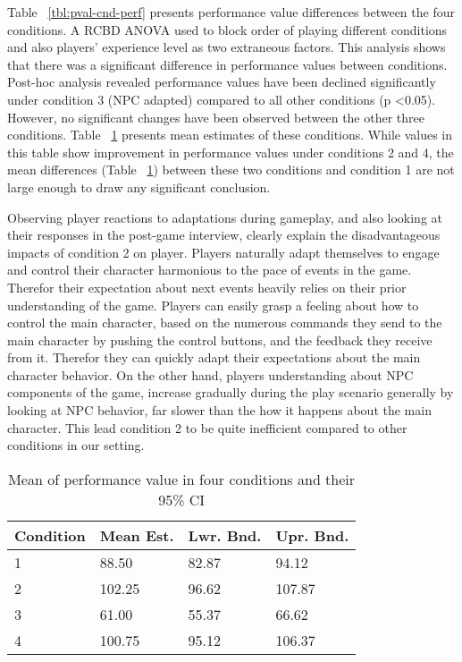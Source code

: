 \documentclass[conference]{IEEEtran}
\begin{document}
Table ~\ref{tbl:pval-cnd-perf} presents performance value differences between the four conditions. A RCBD ANOVA used to block order of playing different conditions and also players' experience level as two extraneous factors. This analysis shows that there was a significant difference in performance values between conditions. Post-hoc analysis revealed performance values have been declined significantly under condition 3 (NPC adapted) compared to all other conditions (p \textless 0.05). However, no significant changes have been observed between the other three conditions. Table ~\ref{tbl:mean-cnd-perf} presents mean estimates of these conditions. While values in this table show improvement in performance values under conditions 2 and 4, the mean differences (Table ~\ref{tbl:mean-cnd-perf}) between these two conditions and condition 1 are not large enough to draw any significant conclusion.

Observing player reactions to adaptations during gameplay, and also looking at their responses in the post-game interview, clearly explain the disadvantageous impacts of condition 2 on player. Players naturally adapt themselves to engage and control their character harmonious to the pace of events in the game. Therefor their expectation about next events heavily relies on their prior understanding of the game. Players can easily grasp a feeling about how to control the main character, based on the numerous commands they send to the main character by pushing the control buttons, and the feedback they receive from it. Therefor they can quickly adapt their expectations about the main character behavior. On the other hand, players understanding about NPC components of the game, increase gradually during the play scenario generally by looking at NPC behavior, far slower than the how it happens about the main character. This lead condition 2 to be quite inefficient compared to other conditions in our setting.

\begin{table}[h]
\caption{Mean of performance value in four conditions and their 95\% CI}
\label{tbl:mean-cnd-perf}
\centering
\begin{tabular}{llll}
\hline
Condition      &   Mean Est.      &   Lwr. Bnd.    &  Upr. Bnd.     \\
\hline
1              &   88.50          &   82.87        &  94.12         \\
2              &   102.25         &   96.62        &  107.87        \\
3              &   61.00          &   55.37        &  66.62         \\
4              &   100.75         &   95.12        &  106.37        \\
\hline
\end{tabular}
\end{table}
\end{document}
